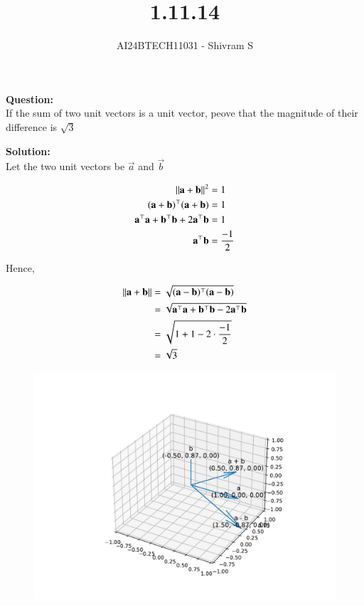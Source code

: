 \documentclass[journal]{IEEEtran}
\begin{document}

\vspace{3cm}

\title{1.11.14}
\author{AI24BTECH11031 - Shivram S
}
{\let\newpage\relax\maketitle}

\renewcommand{\thefigure}{\theenumi}
\renewcommand{\thetable}{\theenumi}
\setlength{\intextsep}{10pt} %


\renewcommand{\thetable}{\theenumi}


\textbf{Question: }\\
If the sum of two unit vectors is a unit vector, peove that the magnitude of their difference
is $\sqrt 3$

\textbf{Solution: } \\
Let the two unit vectors be $\vec{a}$ and $\vec{b}$

$$
\begin{aligned}
    \left\lVert\mathbf{a} + \mathbf{b}\right\rVert^2 &= 1 \\
    (\mathbf{a}+\mathbf{b})^\top(\mathbf{a}+\mathbf{b}) &= 1 \\
    \mathbf{a}^\top\mathbf{a} + \mathbf{b}^\top\mathbf{b} + 2\mathbf{a}^\top\mathbf{b} &= 1 \\
    \mathbf{a}^\top\mathbf{b} &= \frac{-1}{2}
\end{aligned}
$$

Hence,

$$
\begin{aligned}
    \left\lVert\mathbf{a} + \mathbf{b}\right\rVert &= \sqrt{(\mathbf{a}-\mathbf{b})^\top(\mathbf{a}-\mathbf{b})} \\
    &= \sqrt{\mathbf{a}^\top\mathbf{a} + \mathbf{b}^\top\mathbf{b} - 2\mathbf{a}^\top\mathbf{b}} \\
    &= \sqrt{1 + 1 - 2 \cdot \frac{-1}{2}} \\
    &= \sqrt{3}
\end{aligned}
$$

\begin{figure}[h!]
    \centering
    \includegraphics[width=0.7\linewidth]{figs/fig.pdf}
\end{figure}
\end{document}
